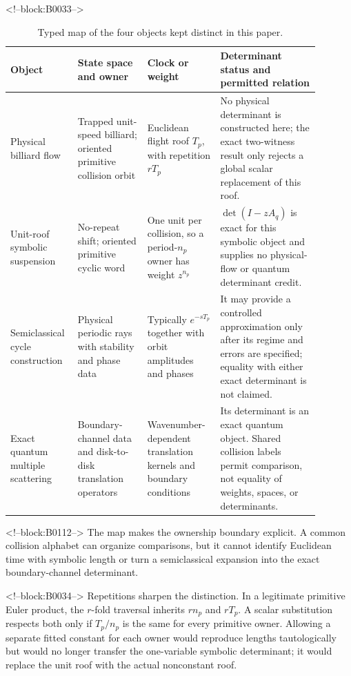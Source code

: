 \documentclass[11pt,a4paper]{article}
\theoremstyle{definition}
\theoremstyle{remark}
\begin{document}
<!--block:B0033-->
\begin{table}[t]
\centering
\caption{Typed map of the four objects kept distinct in this paper.}
\label{tab:object-map}
\small
\begin{tabular}{p{0.16\linewidth}p{0.21\linewidth}p{0.22\linewidth}p{0.30\linewidth}}
\toprule
Object & State space and owner & Clock or weight & Determinant status and permitted relation \\
\midrule
Physical billiard flow & Trapped unit-speed billiard; oriented primitive collision orbit & Euclidean flight roof \(T_p\), with repetition \(rT_p\) & No physical determinant is constructed here; the exact two-witness result only rejects a global scalar replacement of this roof. \\
Unit-roof symbolic suspension & No-repeat shift; oriented primitive cyclic word & One unit per collision, so a period-\(n_p\) owner has weight \(z^{n_p}\) & \(\det(I-zA_q)\) is exact for this symbolic object and supplies no physical-flow or quantum determinant credit. \\
Semiclassical cycle construction & Physical periodic rays with stability and phase data & Typically \(e^{-sT_p}\) together with orbit amplitudes and phases & It may provide a controlled approximation only after its regime and errors are specified; equality with either exact determinant is not claimed. \\
Exact quantum multiple scattering & Boundary-channel data and disk-to-disk translation operators & Wavenumber-dependent translation kernels and boundary conditions & Its determinant is an exact quantum object. Shared collision labels permit comparison, not equality of weights, spaces, or determinants. \\
\bottomrule
\end{tabular}
\end{table}

<!--block:B0112-->
The map makes the ownership boundary explicit. A common collision alphabet can organize comparisons, but it cannot identify Euclidean time with symbolic length or turn a semiclassical expansion into the exact boundary-channel determinant.

<!--block:B0034-->
Repetitions sharpen the distinction. In a legitimate primitive Euler product, the \(r\)-fold traversal inherits \(rn_p\) and \(rT_p\). A scalar substitution respects both only if \(T_p/n_p\) is the same for every primitive owner. Allowing a separate fitted constant for each owner would reproduce lengths tautologically but would no longer transfer the one-variable symbolic determinant; it would replace the unit roof with the actual nonconstant roof.
\end{document}
